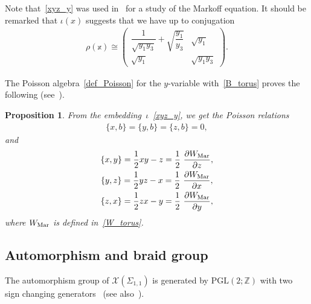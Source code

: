 \documentclass[pdftex]{sigma}
\numberwithin{equation}{section}
\newtheorem{Proposition}[Theorem]{Proposition}
 { \theoremstyle{definition}
\newtheorem{Definition}[Theorem]{Definition}
\newtheorem{Note}[Theorem]{Note}
\newtheorem{Example}[Theorem]{Example}
\newtheorem{Remark}[Theorem]{Remark} }
\begin{document}
Note that~\eqref{xyz_y} was used in~\cite{FockGonc07b} for a study of the Markoff equation. It should be remarked that $\iota(x)$ suggests that we have up to conjugation
\begin{gather*}
 \rho(\mathbb{x}) \cong \begin{pmatrix}
 \dfrac{1}{\sqrt{y_1 y_3}} + \sqrt{\dfrac{y_1}{y_3}} & \sqrt{y_1} \\
 \sqrt{y_1} & \sqrt{y_1 y_3}
 \end{pmatrix} .
\end{gather*}

The Poisson algebra~\eqref{def_Poisson} for the $y$-variable with~\eqref{B_torus} proves the following (see~\cite{WGold97a}).

\begin{Proposition} \label{prop:Poisson_torus} From the embedding~$\iota$~\eqref{xyz_y}, we get the Poisson relations
 \begin{gather*}
 \{ x ,b\} = \{ y , b\} = \{ z , b\} = 0,
 \end{gather*}
 and
 \begin{gather*}
 \{ x, y\} = \frac{1}{2} x y -z = \frac{1}{2}\ \frac{\partial W_{\text{\rm Mar}}}{\partial z} , \\
 \{ y , z\} = \frac{1}{2} y z -x = \frac{1}{2}\ \frac{\partial W_{\text{\rm Mar}}}{\partial x} , \\
 \{ z , x\} = \frac{1}{2} z x - y = \frac{1}{2}\ \frac{\partial W_{\text{\rm Mar}}}{\partial y} ,
 \end{gather*}
 where $W_{\text{\rm Mar}}$ is defined in~\eqref{W_torus}.
\end{Proposition}

\subsection{Automorphism and braid group}

The automorphism group of $\mathcal{X}(\Sigma_{1,1})$ is generated by $\mathrm{PGL}(2;\mathbb{Z})$ with two sign changing gene\-ra\-tors~\cite{WGold03a, RHorow75a} (see also~\cite{GoldmNeuma05a}).
\end{document}

